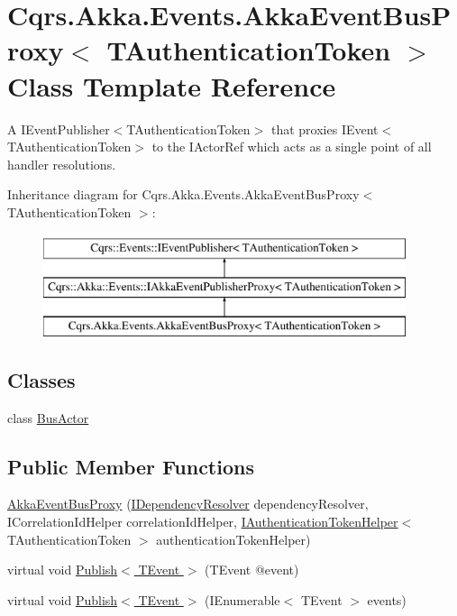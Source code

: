 \hypertarget{classCqrs_1_1Akka_1_1Events_1_1AkkaEventBusProxy}{}\section{Cqrs.\+Akka.\+Events.\+Akka\+Event\+Bus\+Proxy$<$ T\+Authentication\+Token $>$ Class Template Reference}
\label{classCqrs_1_1Akka_1_1Events_1_1AkkaEventBusProxy}


A I\+Event\+Publisher$<$\+T\+Authentication\+Token$>$ that proxies I\+Event$<$\+T\+Authentication\+Token$>$ to the I\+Actor\+Ref which acts as a single point of all handler resolutions.  


Inheritance diagram for Cqrs.\+Akka.\+Events.\+Akka\+Event\+Bus\+Proxy$<$ T\+Authentication\+Token $>$\+:\begin{figure}[H]
\begin{center}
\leavevmode
\includegraphics[height=3.000000cm]{classCqrs_1_1Akka_1_1Events_1_1AkkaEventBusProxy}
\end{center}
\end{figure}
\subsection*{Classes}
\begin{DoxyCompactItemize}
\item 
class \hyperlink{classCqrs_1_1Akka_1_1Events_1_1AkkaEventBusProxy_1_1BusActor}{Bus\+Actor}
\end{DoxyCompactItemize}
\subsection*{Public Member Functions}
\begin{DoxyCompactItemize}
\item 
\hyperlink{classCqrs_1_1Akka_1_1Events_1_1AkkaEventBusProxy_a2f886b4e9e64188fe69478c39c96f2b5}{Akka\+Event\+Bus\+Proxy} (\hyperlink{interfaceCqrs_1_1Configuration_1_1IDependencyResolver}{I\+Dependency\+Resolver} dependency\+Resolver, I\+Correlation\+Id\+Helper correlation\+Id\+Helper, \hyperlink{interfaceCqrs_1_1Authentication_1_1IAuthenticationTokenHelper}{I\+Authentication\+Token\+Helper}$<$ T\+Authentication\+Token $>$ authentication\+Token\+Helper)
\item 
virtual void \hyperlink{classCqrs_1_1Akka_1_1Events_1_1AkkaEventBusProxy_a656daead2fe6f30487855dbaea5a3c83}{Publish$<$ T\+Event $>$} (T\+Event @event)
\item 
virtual void \hyperlink{classCqrs_1_1Akka_1_1Events_1_1AkkaEventBusProxy_af4c202eaab00ed2fb6160d5b114d935c}{Publish$<$ T\+Event $>$} (I\+Enumerable$<$ T\+Event $>$ events)
\end{DoxyCompactItemize}
